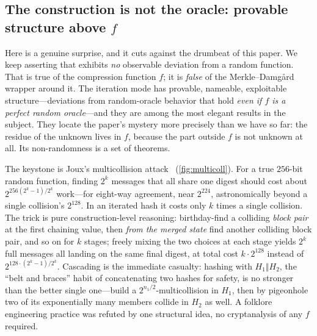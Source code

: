 \subsection{The construction is not the oracle: provable structure
above \texorpdfstring{$f$}{f}}\label{sec:mdstructure}

Here is a genuine surprise, and it cuts against the drumbeat of this
paper. We keep asserting that \SHA{} exhibits \emph{no} observable
deviation from a random function. That is true of the compression
function $f$; it is \emph{false} of the Merkle--Damg{\aa}rd wrapper
around it. The iteration mode has provable, nameable, exploitable
structure---deviations from random-oracle behavior that hold
\emph{even if $f$ is a perfect random oracle}---and they are among the
most elegant results in the subject. They locate the paper's mystery
more precisely than we have so far: the residue of the unknown lives in
$f$, because the part outside $f$ is not unknown at all. Its
non-randomness is a set of theorems.

The keystone is Joux's multicollision attack~\citep{Joux2004}
(\cref{fig:multicoll}). For a true $256$-bit random function, finding
$2^k$ messages that all share one digest should cost about
$2^{256(2^k-1)/2^k}$ work---for eight-way agreement, near $2^{224}$,
astronomically beyond a single collision's $2^{128}$. In an iterated
hash it costs only $k$ times a single collision. The trick is pure
construction-level reasoning: birthday-find a colliding \emph{block
pair} at the first chaining value, then \emph{from the merged state}
find another colliding block pair, and so on for $k$ stages; freely
mixing the two choices at each stage yields $2^k$ full messages all
landing on the same final digest, at total cost $k \cdot 2^{128}$
instead of $2^{128 \cdot (2^k-1)/2^k}$. Cascading is the immediate
casualty: hashing with $H_1 \Vert H_2$, the ``belt and braces'' habit
of concatenating two hashes for safety, is no stronger than the better
single one---build a $2^{n_1/2}$-multicollision in $H_1$, then by
pigeonhole two of its exponentially many members collide in $H_2$ as
well. A folklore engineering practice was refuted by one structural
idea, no cryptanalysis of any $f$ required.

